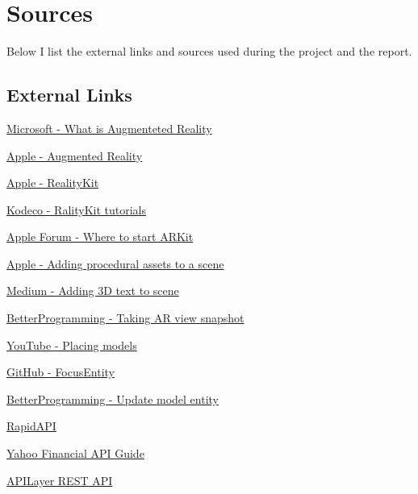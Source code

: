 \documentclass{report}
\begin{document}
\chapter{Sources}

Below I list the external links and sources used during the project and the report.

\section{External Links}

\hyperlink{https://dynamics.microsoft.com/en-us/mixed-reality/guides/what-is-augmented-reality-ar/}{Microsoft - What is Augmenteted Reality}

\hyperlink{https://developer.apple.com/augmented-reality/}{Apple - Augmented Reality}

\hyperlink{https://developer.apple.com/documentation/realitykit/}{Apple - RealityKit}

\hyperlink{https://www.kodeco.com/books/apple-augmented-reality-by-tutorials/v1.0/chapters/iii-introduction}{Kodeco - RalityKit tutorials}

\hyperlink{https://developer.apple.com/forums/thread/658300}{Apple Forum - Where to start ARKit}

\hyperlink{https://developer.apple.com/documentation/realitykit/adding-procedural-assets-to-a-scene}{Apple - Adding procedural assets to a scene}

\hyperlink{https://coledennis.medium.com/tutorial-generating-3d-text-with-realitykit-in-a-swiftui-app-fa2a50403012}{Medium - Adding 3D text to scene}

\hyperlink{https://betterprogramming.pub/take-an-arview-snapshot-in-realitykit-93b620cf99b3}{BetterProgramming - Taking AR view snapshot}

\hyperlink{https://www.youtube.com/watch?v=9R_G0EI-UoI}{YouTube - Placing models}

\hyperlink{https://github.com/maxxfrazer/FocusEntity}{GitHub - FocusEntity}

\hyperlink{https://betterprogramming.pub/how-to-add-text-to-an-arview-in-an-ios-application-tutorial-f3f746f4dc1f}{BetterProgramming - Update model entity}

\hyperlink{https://rapidapi.com/apidojo/api/yahoo-finance1}{RapidAPI}

\hyperlink{https://algotrading101.com/learn/yahoo-finance-api-guide/}{Yahoo Financial API Guide}

\hyperlink{https://apilayer.com/marketplace/exchangerates_data-api}{APILayer REST API}
\end{document}
